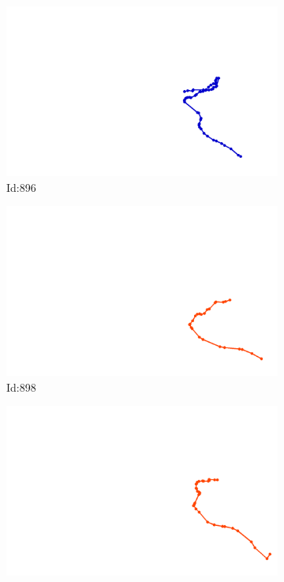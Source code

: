 \documentclass[12pt,twoside]{report}
\begin{document}
\begin{figure}
\begin{subfigure}[b]{0.20\textwidth}
\centering
\includegraphics[width=\textwidth]{../trajectories/896.png}
\caption{Id:896}
\end{subfigure}
\begin{subfigure}[b]{0.20\textwidth}
\centering
\includegraphics[width=\textwidth]{../trajectories/898.png}
\caption{Id:898}
\end{subfigure}
\begin{subfigure}[b]{0.20\textwidth}
\centering
\includegraphics[width=\textwidth]{../trajectories/912.png}

\end{subfigure}
\end{figure}
\end{document}
